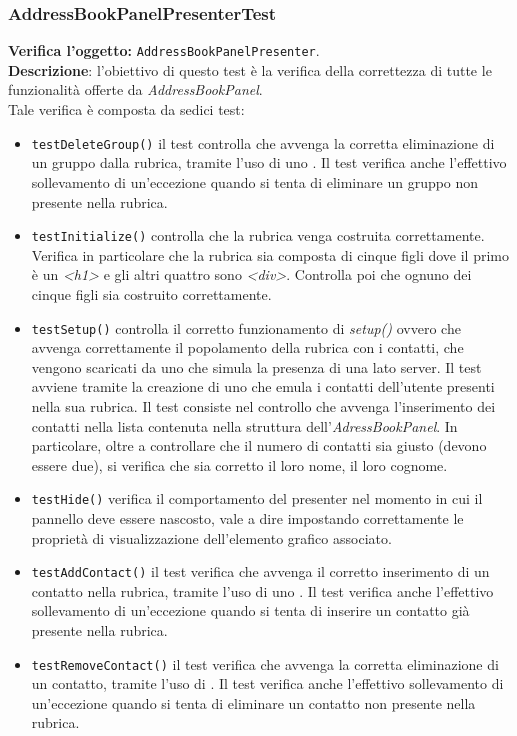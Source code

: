 \subsubsection{AddressBookPanelPresenterTest}
\textbf{Verifica l'oggetto:} \texttt{AddressBookPanelPresenter}.\\
\textbf{Descrizione}: l'obiettivo di questo test è la verifica della correttezza di tutte le funzionalità offerte da \textit{AddressBookPanel}.\\
Tale verifica è composta da sedici test:
\begin{itemize}
\item \texttt{testDeleteGroup()} il test controlla che avvenga la corretta eliminazione di un gruppo dalla rubrica, tramite l'uso di uno . Il test verifica anche l'effettivo sollevamento di un'eccezione quando si tenta di eliminare un gruppo non presente nella rubrica.
\item \texttt{testInitialize()} controlla che la rubrica venga costruita correttamente. Verifica in particolare che la rubrica sia composta di cinque figli dove il primo è un \textit{<h1>} e gli altri quattro sono \textit{<div>}. Controlla poi che ognuno dei cinque figli sia costruito correttamente. 
\item \texttt{testSetup()} controlla il corretto funzionamento di \textit{setup()} ovvero che avvenga correttamente il popolamento della rubrica con i contatti, che vengono scaricati da uno  che simula la presenza di una  lato server. 
Il test avviene tramite la creazione di uno  che emula i contatti dell'utente presenti nella sua rubrica. 
Il test consiste nel controllo che avvenga l'inserimento dei contatti nella lista contenuta nella struttura dell'\textit{AdressBookPanel}. In particolare, oltre a controllare che il numero di contatti sia giusto (devono essere due), si verifica che sia corretto il loro nome, il loro cognome.
\item \texttt{testHide()} verifica il comportamento del presenter nel momento in cui il pannello deve essere nascosto, vale a dire impostando correttamente le proprietà di visualizzazione dell'elemento grafico associato.
\item \texttt{testAddContact()} il test verifica che avvenga il corretto inserimento di un contatto nella rubrica, tramite l'uso di uno . Il test verifica anche l'effettivo sollevamento di un'eccezione quando si tenta di inserire un contatto già presente nella rubrica.
\item \texttt{testRemoveContact()} il test verifica che avvenga la corretta eliminazione di un contatto, tramite l'uso di . Il test verifica anche l'effettivo sollevamento di un'eccezione quando si tenta di eliminare un contatto non presente nella rubrica.

\end{itemize}
